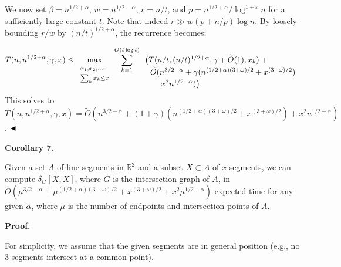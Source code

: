 \documentclass[10pt,a4paper]{article}
\begin{document}
\par
We now set $\beta=n^{1/2+\alpha}$, $w=n^{1/2-\alpha}$, $r=n/t$, and $p=n^{1/2+\alpha}/\log^{1+\varepsilon}n$ for a sufficiently large constant $t$. Note that indeed $r\gg w(p+n/p)\log n$. By loosely bounding $r/w$ by $(n/t)^{1/2+\alpha}$, the recurrence becomes:
\par
\[\begin{aligned}
T(n,n^{1/2+\alpha},\gamma,x)\leq\max_{\begin{array}[]{l}\scriptstyle{x_{1},x_{%
2},\ldots:}\\
\scriptstyle{\sum_{k}x_{k}\leq x}\end{array}}\sum_{k=1}^{O(t\log t)}\begin{%
array}[t]{l}\big(T(n/t,(n/t)^{1/2+\alpha},\gamma+\widetilde{O}(1),x_{k})+{}\\[%
2.15277pt]
\ \ \widetilde{O}(n^{3/2-\alpha}+\gamma(n^{(1/2+\alpha)(3+\omega)/2}+x^{(3+%
\omega)/2}){}\\[2.15277pt]
\ \ \ \ \ \ x^{2}n^{1/2-\alpha})\big).\end{array}
\end{aligned}\]
This solves to $T(n,n^{1/2+\alpha},\gamma,x)=\widetilde{O}(n^{3/2-\alpha}+(1+\gamma)(n^{(1/2+%
\alpha)(3+\omega)/2}+x^{(3+\omega)/2})+x^{2}n^{1/2-\alpha})$. $\hfill\blacktriangleleft$
\par
\par
\par\medskip\noindent\textbf{Corollary 7.}\par
Given a set $A$ of line segments in $\mathbb{R}^{2}$ and a subset $X\subset A$ of $x$ segments, we can compute $\delta_{G}[X,X]$, where $G$ is the intersection graph of $A$, in $\widetilde{O}(\mu^{3/2-\alpha}+\mu^{(1/2+\alpha)(3+\omega)/2}+x^{(3+\omega)/2}%
+x^{2}\mu^{1/2-\alpha})$ expected time for any given $\alpha$, where $\mu$ is the number of endpoints and intersection points of $A$.
\par
\par
\par
\par\medskip\noindent\textbf{Proof.}\par
For simplicity, we assume that the given segments are in general position (e.g., no 3 segments intersect at a common point).
\par
\par
\end{document}
